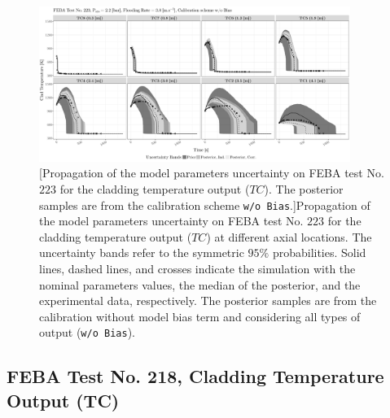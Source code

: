 \clearpage
\begin{figure}
	\centering
	\includegraphics[width=0.90\textwidth]{../figures/chapter5/figures/plotTraceUQPosteriorAllNoDiscNoBCTC223}
		[Propagation of the model parameters uncertainty on FEBA test No. $223$ for the cladding temperature output ($TC$). The posterior samples are from the calibration scheme \texttt{w/o Bias}.]{Propagation of the model parameters uncertainty on FEBA test No. $223$ for the cladding temperature output ($TC$) at different axial locations. The uncertainty bands refer to the symmetric $95\%$ probabilities. Solid lines, dashed lines, and crosses indicate the simulation with the nominal parameters values, the median of the posterior, and the experimental data, respectively. The posterior samples are from the calibration without model bias term and considering all types of output (\texttt{w/o Bias}).}
	\label{fig:ch5_plot_trace_uq_post_tc_223_nodisc}
\end{figure}
\clearpage

\subsection{FEBA Test No. 218, Cladding Temperature Output (TC)}\label{app:tbl_results_uq_post_tc_218}

